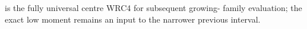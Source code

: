 is the fully universal centre WRC4 for subsequent growing-
family evaluation; the exact low moment remains an input
to the narrower previous interval.